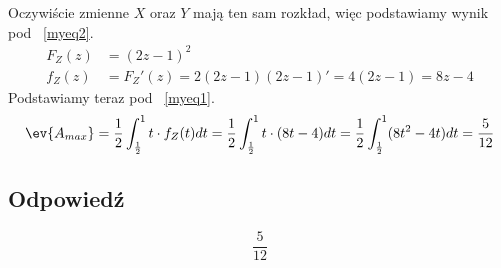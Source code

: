 Oczywiście zmienne \(X\) oraz \(Y\) mają ten sam rozkład, więc podstawiamy wynik pod ~\eqref{myeq2}.
\begin{align*}
	F_Z(z) & = \left(2z-1\right)^2                       \\
	f_Z(z) & = F_Z'(z) = 2(2z-1)(2z-1)' = 4(2z-1) = 8z-4
\end{align*}
Podstawiamy teraz pod ~\eqref{myeq1}.
\begin{align*}
	\ev{A_{max}} = \frac{1}{2} \int_{\frac{1}{2}}^{1} t \cdot f_Z(t)dt = \frac{1}{2}  \int_{\frac{1}{2}}^1 t \cdot (8t-4)dt = \frac{1}{2} \int_{\frac{1}{2}}^1 (8t^2-4t) dt = \frac{5}{12}
\end{align*}

\subsection*{Odpowiedź}
\[
	\boxed{\frac{5}{12}}
\]
